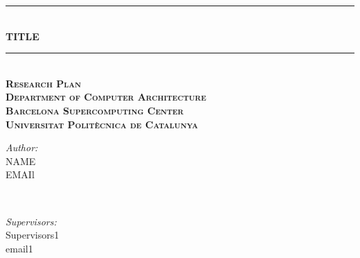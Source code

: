 \documentclass{book}
\newcommand{\HRule}{\rule{\linewidth}{0.5mm}} %
\begin{document}
\begin{titlepage}

\center %



\HRule \\[0.4cm]
{ \huge \bfseries TITLE}\\[0.4cm] %
\HRule \\[1.5cm]

\textsc{\huge \textbf{Research Plan}}\\[1.5cm]

\textsc{\Large \textbf{Department of Computer Architecture \\[0.07cm] Barcelona Supercomputing Center \\[0.24cm] Universitat Polit\`ecnica de Catalunya}}\\[1.5cm]


\vspace{0.8cm}
\begin{minipage}{0.4\textwidth}
\begin{flushleft} \large
\Large \emph{Author:}\\[0.1cm]
\Large NAME \\
EMAIl
\end{flushleft}
\end{minipage}
~
\begin{minipage}{0.4\textwidth}
\begin{flushright} \large
\Large \emph{Supervisors:} \\[0.1cm]
\Large Supervisors1 \\
email1 \\[0.1cm]
\end{flushright}
\vspace{-1.47cm}
\end{minipage}\\[3cm]


\end{titlepage}
\end{document}
